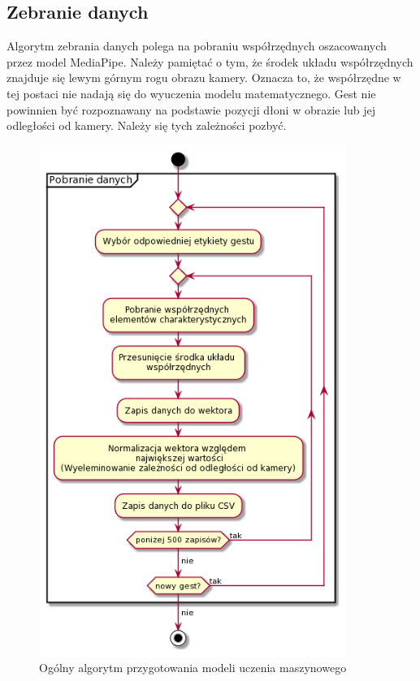 \subsection{Zebranie danych}
\quad Algorytm zebrania danych polega na pobraniu współrzędnych oszacowanych przez model MediaPipe. Należy pamiętać o tym, że środek układu współrzędnych znajduje się lewym górnym rogu obrazu kamery. Oznacza to, że współrzędne w tej postaci nie nadają się do wyuczenia modelu matematycznego. Gest nie powinnien być rozpoznawany na podstawie pozycji dłoni w obrazie lub jej odległości od kamery. Należy się tych zależności pozbyć. 

\begin{figure}[H]
    \begin{center}
        \includegraphics[width=10cm]{../images/get_data.png}
        \caption{Ogólny algorytm przygotowania modeli uczenia maszynowego}
    \end{center}
\end{figure}

